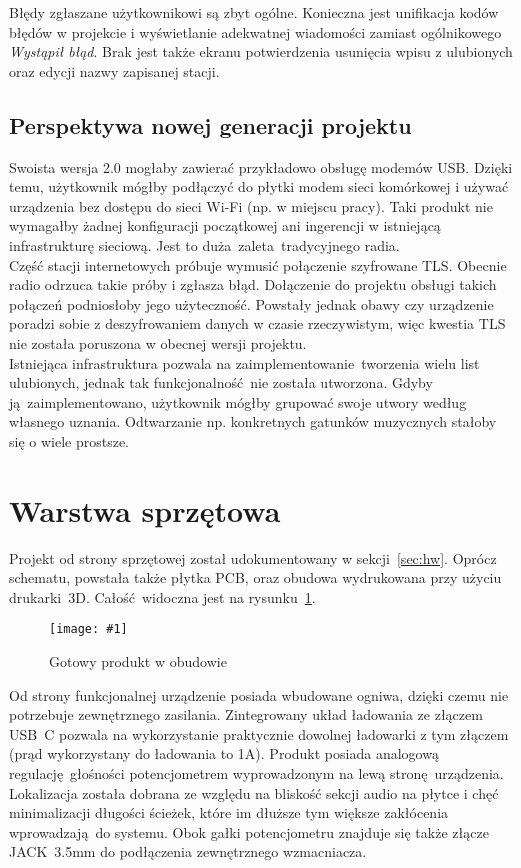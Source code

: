 \documentclass[polish]{aghengthesis}
\newcommand{\imgint}[4]{
	\begin{figure}[{#4}]
		\centering
		\texttt{[image: \#1]}
		\caption{#2}
		\label{#1}
	\end{figure}
}
\newcommand{\imgh}[3]{\imgint{#1}{#2}{#3}{H}}
\begin{document}
			Błędy zgłaszane użytkownikowi są zbyt ogólne. Konieczna jest unifikacja kodów błędów w projekcie i wyświetlanie adekwatnej wiadomości zamiast ogólnikowego \textit{Wystąpił błąd}. Brak jest także ekranu potwierdzenia usunięcia wpisu z ulubionych oraz edycji nazwy zapisanej stacji.
		
		\subsection{Perspektywa nowej generacji projektu}
			Swoista wersja 2.0 mogłaby zawierać przykładowo obsługę modemów USB. Dzięki temu, użytkownik mógłby podłączyć do płytki modem sieci komórkowej i używać urządzenia bez dostępu do sieci Wi-Fi (np. w miejscu pracy). Taki produkt nie wymagałby żadnej konfiguracji początkowej ani ingerencji w istniejącą infrastrukturę sieciową. Jest to duża zaleta tradycyjnego radia.
			$ $\\
			
			Część stacji internetowych próbuje wymusić połączenie szyfrowane TLS. Obecnie radio odrzuca takie próby i zgłasza błąd. Dołączenie do projektu obsługi takich połączeń podniosłoby jego użyteczność. Powstały jednak obawy czy urządzenie poradzi sobie z deszyfrowaniem danych w czasie rzeczywistym, więc kwestia TLS nie została poruszona w obecnej wersji projektu.
			$ $\\
			
			Istniejąca infrastruktura pozwala na zaimplementowanie tworzenia wielu list ulubionych, jednak tak funkcjonalność nie została utworzona. Gdyby ją zaimplementowano, użytkownik mógłby grupować swoje utwory według własnego uznania. Odtwarzanie np. konkretnych gatunków muzycznych stałoby się o wiele prostsze.
			
	\section{Warstwa sprzętowa}
		Projekt od strony sprzętowej został udokumentowany w sekcji~\ref{sec:hw}. Oprócz schematu, powstała także płytka PCB, oraz obudowa wydrukowana przy użyciu drukarki~3D. Całość widoczna jest na rysunku~\ref{5/hw_result}.
		
		\imgh{5/hw_result}{Gotowy produkt w obudowie}{0.7}
		
		Od strony funkcjonalnej urządzenie posiada wbudowane ogniwa, dzięki czemu nie potrzebuje zewnętrznego zasilania. Zintegrowany układ ładowania ze złączem USB~C pozwala na wykorzystanie praktycznie dowolnej ładowarki z tym złączem (prąd wykorzystany do ładowania to 1A). Produkt posiada analogową regulację głośności potencjometrem wyprowadzonym na lewą stronę urządzenia. Lokalizacja została dobrana ze względu na bliskość sekcji audio na płytce i chęć minimalizacji długości ścieżek, które im dłuższe tym większe zakłócenia wprowadzają do systemu. Obok gałki potencjometru znajduje się także złącze JACK~3.5mm do podłączenia zewnętrznego wzmacniacza.
		
\end{document}
